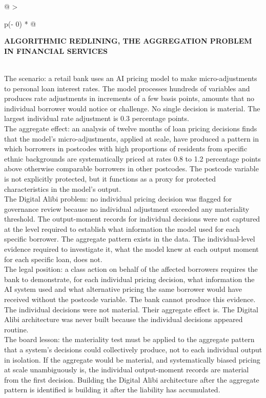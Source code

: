 \begin{longtable}[]{@{}
  >{\raggedright\arraybackslash}p{(\columnwidth - 0\tabcolsep) * }@{}}
\toprule\noalign{}
\begin{minipage}[b]{\linewidth}\raggedright
\textbf{ALGORITHMIC REDLINING, THE AGGREGATION PROBLEM IN FINANCIAL SERVICES}
\end{minipage} \\
\midrule\noalign{}
\endhead
\bottomrule\noalign{}
\endlastfoot
The scenario: a retail bank uses an AI pricing model to make micro-adjustments to personal loan interest rates. The model processes hundreds of variables and produces rate adjustments in increments of a few basis points, amounts that no individual borrower would notice or challenge. No single decision is material. The largest individual rate adjustment is 0.3 percentage points. \\
The aggregate effect: an analysis of twelve months of loan pricing decisions finds that the model's micro-adjustments, applied at scale, have produced a pattern in which borrowers in postcodes with high proportions of residents from specific ethnic backgrounds are systematically priced at rates 0.8 to 1.2 percentage points above otherwise comparable borrowers in other postcodes. The postcode variable is not explicitly protected, but it functions as a proxy for protected characteristics in the model's output. \\
The Digital Alibi problem: no individual pricing decision was flagged for governance review because no individual adjustment exceeded any materiality threshold. The output-moment records for individual decisions were not captured at the level required to establish what information the model used for each specific borrower. The aggregate pattern exists in the data. The individual-level evidence required to investigate it, what the model knew at each output moment for each specific loan, does not. \\
The legal position: a class action on behalf of the affected borrowers requires the bank to demonstrate, for each individual pricing decision, what information the AI system used and what alternative pricing the same borrower would have received without the postcode variable. The bank cannot produce this evidence. The individual decisions were not material. Their aggregate effect is. The Digital Alibi architecture was never built because the individual decisions appeared routine. \\
The board lesson: the materiality test must be applied to the aggregate pattern that a system's decisions could collectively produce, not to each individual output in isolation. If the aggregate would be material, and systematically biased pricing at scale unambiguously is, the individual output-moment records are material from the first decision. Building the Digital Alibi architecture after the aggregate pattern is identified is building it after the liability has accumulated. \\
\end{longtable}

